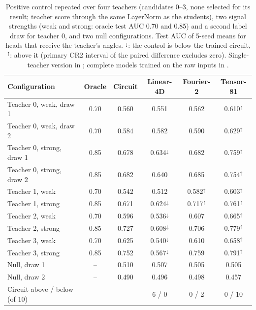 \documentclass[11pt,a4paper]{article}
\begin{document}
\begin{table}[htbp]
\centering
\caption{Positive control repeated over four teachers (candidates 0--3, none selected for its result; teacher score through the same LayerNorm as the students), two signal strengths (weak and strong: oracle test AUC 0.70 and 0.85) and a second label draw for teacher 0, and two null configurations. Test AUC of 5-seed means for heads that receive the teacher's angles. $^{\downarrow}$: the control is below the trained circuit, $^{\uparrow}$: above it (primary CR2 interval of the paired difference excludes zero). Single-teacher version in ; complete models trained on the raw inputs in .}
\label{tab:teacher_main}
{\small
\begin{tabular}{lccccc}
\toprule
\textbf{Configuration} & \textbf{Oracle} & \textbf{Circuit} & \textbf{Linear-4D} & \textbf{Fourier-2} & \textbf{Tensor-81} \\
\midrule
Teacher 0, weak, draw 1 & 0.70 & 0.560 & 0.551 & 0.562 & 0.610$^{\uparrow}$ \\
Teacher 0, weak, draw 2 & 0.70 & 0.584 & 0.582 & 0.590 & 0.629$^{\uparrow}$ \\
Teacher 0, strong, draw 1 & 0.85 & 0.678 & 0.634$^{\downarrow}$ & 0.682 & 0.759$^{\uparrow}$ \\
Teacher 0, strong, draw 2 & 0.85 & 0.682 & 0.640 & 0.685 & 0.754$^{\uparrow}$ \\
Teacher 1, weak & 0.70 & 0.542 & 0.512 & 0.582$^{\uparrow}$ & 0.603$^{\uparrow}$ \\
Teacher 1, strong & 0.85 & 0.671 & 0.624$^{\downarrow}$ & 0.717$^{\uparrow}$ & 0.761$^{\uparrow}$ \\
Teacher 2, weak & 0.70 & 0.596 & 0.536$^{\downarrow}$ & 0.607 & 0.665$^{\uparrow}$ \\
Teacher 2, strong & 0.85 & 0.727 & 0.608$^{\downarrow}$ & 0.706 & 0.779$^{\uparrow}$ \\
Teacher 3, weak & 0.70 & 0.625 & 0.540$^{\downarrow}$ & 0.610 & 0.658$^{\uparrow}$ \\
Teacher 3, strong & 0.85 & 0.752 & 0.567$^{\downarrow}$ & 0.759 & 0.791$^{\uparrow}$ \\
\midrule
Null, draw 1 & -- & 0.510 & 0.507 & 0.505 & 0.505 \\
Null, draw 2 & -- & 0.490 & 0.496 & 0.498 & 0.457 \\
\midrule
Circuit above / below (of 10) & & & 6 / 0 & 0 / 2 & 0 / 10 \\
\bottomrule
\end{tabular}}
\end{table}
\end{document}
